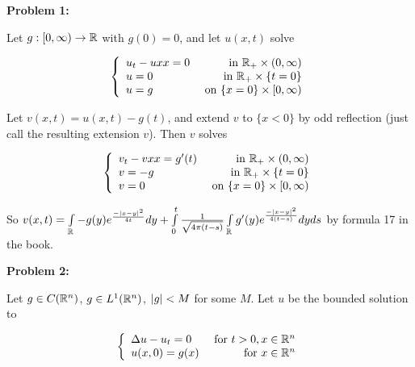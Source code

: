\documentclass[a4paper,12pt]{article}
\begin{document}
{\bf Problem 1:}

Let $g: [0,\infty) \to \mathbb{R}$ with $g(0) = 0$, and let $u(x,t)$ solve

\begin{displaymath}
   \left\{
     \begin{array}{lr}
       u_t - u{xx} = 0 & \text{ in } \mathbb{R}_+ \times (0,\infty) \\
       u=0 & \text{ in } \mathbb{R}_+ \times \{t=0\}\\
       u=g & \text{ on } \{x=0\} \times [0,\infty)
     \end{array}
   \right.
\end{displaymath}

Let $v(x,t) = u(x,t) - g(t)$, and extend $v$ to $\{x<0\}$ by odd reflection (just call the resulting extension $v$). Then $v$ solves

\begin{displaymath}
   \left\{
     \begin{array}{lr}
       v_t - v{xx} = g'(t) & \text{ in } \mathbb{R}_+ \times (0,\infty) \\
       v=-g & \text{ in } \mathbb{R}_+ \times \{t=0\}\\
       v=0 & \text{ on } \{x=0\} \times [0,\infty)
     \end{array}
   \right.
\end{displaymath}

So $v(x,t) = \int\limits_{\mathbb{R}} -g(y)e^{\frac{-\left\lvert x-y \right\rvert^2}{4t}} dy +  \int\limits_0^t \frac{1}{\sqrt{4 \pi (t-s)}} \int\limits_{\mathbb{R}} g'(y) e^{\frac{-\left\lvert x-y \right\rvert^2}{4(t-s)}} dy ds$ by formula 17 in the book. 



\shunt

{\bf Problem 2:}

Let $g \in C(\mathbb{R}^n)$, $g \in L^1(\mathbb{R}^n)$, $\left\lvert g \right\rvert < M$ for some $M$. Let $u$ be the bounded solution to 

\begin{displaymath}
   \left\{
     \begin{array}{lr}
       \Delta u -u_t  = 0 & \text{ for } t>0, x \in \mathbb{R}^n \\
       u(x,0) = g(x) & \text{ for } x \in \mathbb{R}^n
     \end{array}
   \right.
\end{displaymath}
\end{document}
